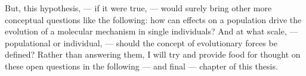











But, this hypothesis, — if it were true, — would surely bring other more conceptual questions like the following:
how can effects on a population drive the evolution of a molecular mechanism in single individuals?
And at what scale, — populational or individual, — should the concept of evolutionary forces be defined?
Rather than answering them, I will try and provide food for thought on these open questions in the following — and final — chapter of this thesis.







